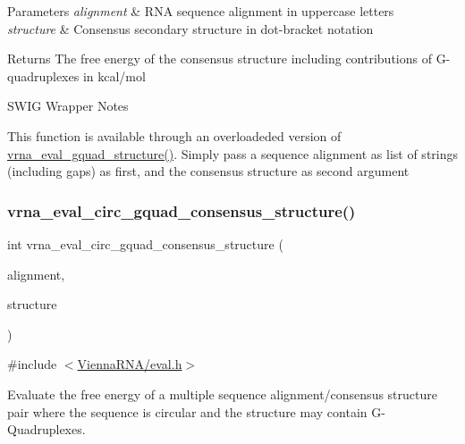 \begin{DoxyParams}{Parameters}
{\em alignment} & R\+NA sequence alignment in uppercase letters \\
\hline
{\em structure} & Consensus secondary structure in dot-\/bracket notation \\
\hline
\end{DoxyParams}
\begin{DoxyReturn}{Returns}
The free energy of the consensus structure including contributions of G-\/quadruplexes in kcal/mol
\end{DoxyReturn}
\begin{DoxyRefDesc}{S\+W\+I\+G Wrapper Notes}
\item[\hyperlink{wrappers__wrappers000047}{S\+W\+I\+G Wrapper Notes}]This function is available through an overloadeded version of \hyperlink{group__eval_ga3263504825ef4b523eba797c99921df4}{vrna\+\_\+eval\+\_\+gquad\+\_\+structure()}. Simply pass a sequence alignment as list of strings (including gaps) as first, and the consensus structure as second argument \end{DoxyRefDesc}
\mbox{\label{group__eval_gac673ebb9ae2a29f54d201e2ac5b85540}} 
\subsubsection{\texorpdfstring{vrna\+\_\+eval\+\_\+circ\+\_\+gquad\+\_\+consensus\+\_\+structure()}{vrna\_eval\_circ\_gquad\_consensus\_structure()}}
{\footnotesize\ttfamily int vrna\+\_\+eval\+\_\+circ\+\_\+gquad\+\_\+consensus\+\_\+structure (\begin{DoxyParamCaption}\item[{const char $\ast$$\ast$}]{alignment,  }\item[{const char $\ast$}]{structure }\end{DoxyParamCaption})}



{\ttfamily \#include $<$\hyperlink{eval_8h}{Vienna\+R\+N\+A/eval.\+h}$>$}



Evaluate the free energy of a multiple sequence alignment/consensus structure pair where the sequence is circular and the structure may contain G-\/\+Quadruplexes. 

